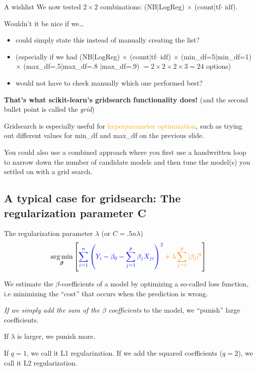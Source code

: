 \documentclass[compress]{beamer}
\begin{document}
\begin{frame}{A wishlist}
We now tested $2\times 2$ combinations: (NB|LogReg) $\times$ (count|tf$\cdot$ idf).

	Wouldn't it be nice if we\ldots
\begin{itemize}[<+->]
	\item could simply state this instead of manually creating the list?
	\item (especially if we had  (NB|LogReg) $\times$ (count|tf$\cdot$ idf)  $\times$ (min\_df=5|min\_df=1)  $\times$ (max\_df=.5|max\_df=.8 |max\_df=.9)  $= 2\times 2\times 2\times 3 = 24$ options)
	\item would not have to check manually which one performed best?
\end{itemize}
\pause
\textbf{That's what scikit-learn's gridsearch functionality does!} (and the second bullet point is called the \textit{grid})
\end{frame}


\begin{frame}[standout]
Gridsearch is especially useful for \textcolor{orange}{hyperparameter optimization}, such as trying out different values for min\_df and max\_df on the previous slide.

You could also use a combined approach where you first use a handwritten loop to narrow down the number of candidate models and then tune the model(s) you settled on with a grid search.
\end{frame}


\subsection{A typical case for gridsearch: The regularization parameter C}


\begin{frame}{The regularization parameter $\lambda$ (or $C = .5n\lambda$)}
$$
\underset{\boldsymbol{\beta}}{\arg \min }\left[\color{blue} \sum_{i=1}^{n}\left(Y_{i}-\beta_{0}-\sum_{j=1}^{p} \beta_{j} X_{j i}\right)^{2}\color{orange} +\lambda \sum_{j=1}^{p}\left|\beta_{j}\right|^{q} \color{black} \right]
$$

\color{blue}We estimate the $\beta$-coefficients of a model by optimizing a so-called loss function, i.e minimizing the ``cost'' that occurs when the prediction is wrong.

\color{orange} \emph{If we simply add the sum of the $\beta$ coefficients} to the model, we ``punish'' large coefficients.
\color{black}
\pause

If $\lambda$ is larger, we punish more.

\tiny{If $q=1$, we call it L1 regularization. If we add the squared coefficients ($q=2$), we call it L2 regularization.}
\end{frame}
\end{document}
